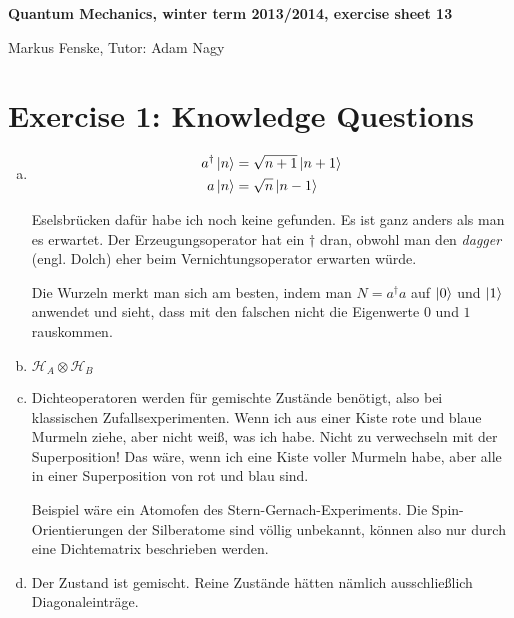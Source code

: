 \documentclass[a4paper,german,12pt,smallheadings]{scrartcl}
\begin{document}
\allowdisplaybreaks %
\begin{center}
\bfseries %
\sffamily %
\vspace{-40pt}
Quantum Mechanics, winter term 2013/2014, exercise sheet 13

Markus Fenske, Tutor: Adam Nagy
\vspace{-10pt}
\end{center}

\section*{Exercise 1: Knowledge Questions}
\begin{enumerate}[a)]
  \item
    \begin{align*}
      a^\dagger \ket{n} &= \sqrt{n+1} \ket{n+1} \\
      a         \ket{n} &= \sqrt{n}   \ket{n-1}
    \end{align*}

    Eselsbrücken dafür habe ich noch keine gefunden. Es ist ganz anders als man
    es erwartet. Der Erzeugungsoperator hat ein $\dagger$ dran, obwohl man den
    \textit{dagger} (engl. Dolch) eher beim Vernichtungsoperator erwarten
    würde.

    Die Wurzeln merkt man sich am besten, indem man $N = a^\dagger a$ auf
    $\ket{0}$ und $\ket{1}$ anwendet und sieht, dass mit den falschen nicht die
    Eigenwerte $0$ und $1$ rauskommen.

  \item $\mathcal{H}_A \otimes \mathcal{H}_B$

  \item
    Dichteoperatoren werden für gemischte Zustände benötigt, also bei
    klassischen Zufallsexperimenten. Wenn ich aus einer Kiste rote und blaue
    Murmeln ziehe, aber nicht weiß, was ich habe. Nicht zu verwechseln mit der
    Superposition! Das wäre, wenn ich eine Kiste voller Murmeln habe, aber alle
    in einer Superposition von rot und blau sind.

    Beispiel wäre ein Atomofen des Stern-Gernach-Experiments. Die
    Spin-Orientierungen der Silberatome sind völlig unbekannt, können also nur
    durch eine Dichtematrix beschrieben werden.

  \item
    Der Zustand ist gemischt. Reine Zustände hätten nämlich ausschließlich
    Diagonaleinträge.


\end{enumerate}
\end{document}
